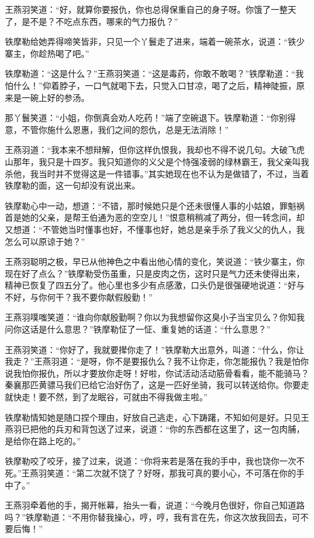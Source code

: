 \documentclass[12pt,oneside]{book}
\begin{document}
王燕羽笑道：``好，就算你要报仇，你也总得保重自己的身子呀。你饿了一整天了，是不是？不吃点东西，哪来的气力报仇？''

铁摩勒给她弄得啼笑皆非，只见一个丫鬟走了进来，端着一碗茶水，说道：``铁少寨主，你趁热喝了吧。''

铁摩勒道：``这是什么？''王燕羽笑道：``这是毒药，你敢不敢喝？''铁摩勒道：``我怕什么！''仰着脖子，一口气就喝下去，只觉入口甘凉，喝了之后，精神陡振，原来是一碗上好的参汤。

那丫鬟笑道：``小姐，你倒真会劝人吃药！''端了空碗退下。铁摩勒道：``你别得意，不管你施什么恩惠，我们之间的怨仇，总是无法消除！''

王燕羽道：``我本来不想辩解，但你这样仇恨我，我却也不得不说几句。大破飞虎山那年，我只是十四岁。我只知道你的义父是个恃强凌弱的绿林霸王，我父亲叫我杀他，我当时并不觉得这是一件错事。''其实她现在也不认为是做错了，不过，当着铁摩勒的面，这一句却没有说出来。

铁摩勒心中一动，想道：``不错，那时候她只是个还未很懂人事的小姑娘，罪魁祸首是她的父亲，是帮王伯通为恶的空空儿！''恨意稍稍减了两分，但一转念间，却又想道：``不管她当时懂事也好，不懂事也好，她总是亲手杀了我义父的仇人，我怎么可以原谅于她？''

王燕羽聪明之极，早已从他神色之中看出他心情的变化，笑说道：``铁少寨主，你现在好了点么？''铁摩勒受伤虽重，只是皮肉之伤，这时只是气力还未使得出来，精神已恢复了四五分了。他心里也多少有点感激，口头仍是很强硬地说道：``好与不好，与你何干？我不要你献假殷勤！''

王燕羽噗嗤笑道：``谁向你献殷勤啊？你以为我想留你这臭小子当宝贝么？你知我问你这话是什么意思？''铁摩勒怔了一怔、重复她的话道：``什么意思？''

王燕羽笑道：``你好了，我就要撵你走了！''铁摩勒大出意外，叫道：``什么，你让我走？''王燕羽道：``是呀，你不是要报仇么？我不让你走，你怎能报仇？我是怕你说我怕你报仇，所以才要放你走呀！好啦，你试活动活动筋骨看看，能不能骑马？秦襄那匹黄骠马我们已给它治好伤了，这是一匹好坐骑，我可以转送给你。你要走就快走！要不然，到了龙眠谷，可就由不得我做主啦。''

铁摩勒情知她是随口捏个理由，好放自己逃走，心下踌躇，不知如何是好。只见王燕羽已把他的兵刃和背包送了过来，说道：``你的东西都在这里了，这一包肉脯，是给你在路上吃的。''

铁摩勒咬了咬牙，接了过来，说道：``你将来若是落在我的手中，我也饶你一次不死。''王燕羽笑道：``第二次就不饶了？好呀，那我可真的要小心，不可落在你的手中了。''

王燕羽牵着他的手，揭开帐幕，抬头一看，说道：``今晚月色很好，你自己知道路吗？''铁摩勒道：``不用你替我操心，哼，哼，我有言在先，你这次放我回去，可不要后悔！''
\end{document}

